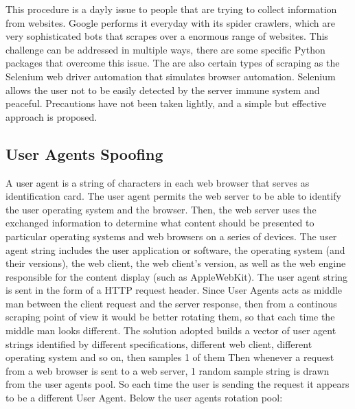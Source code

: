 \documentclass[
  12pt,
  a4paper,
  oneside]{book}
\begin{document}
This procedure is a dayly issue to people that are trying to collect information from websites. Google performs it everyday with its spider crawlers, which are very sophisticated bots that scrapes over a enormous range of websites. This challenge can be addressed in multiple ways, there are some specific Python packages that overcome this issue. The are also certain types of scraping as the Selenium web driver automation that simulates browser automation. Selenium allows the user not to be easily detected by the server immune system and peaceful. Precautions have not been taken lightly, and a simple but effective approach is proposed.

\hypertarget{spoofing}{%
\subsection{User Agents Spoofing}\label{spoofing}}

A user agent \citep{whoishostingthis.com} is a string of characters in each web browser that serves as identification card. The user agent permits the web server to be able to identify the user operating system and the browser. Then, the web server uses the exchanged information to determine what content should be presented to particular operating systems and web browsers on a series of devices. The user agent string includes the user application or software, the operating system (and their versions), the web client, the web client's version, as well as the web engine responsible for the content display (such as AppleWebKit). The user agent string is sent in the form of a HTTP request header. Since User Agents acts as middle man between the client request and the server response, then from a continous scraping point of view it would be better rotating them, so that each time the middle man looks different. The solution adopted builds a vector of user agent strings identified by different specifications, different web client, different operating system and so on, then samples 1 of them
Then whenever a request from a web browser is sent to a web server, 1 random sample string is drawn from the user agents pool. So each time the user is sending the request it appears to be a different User Agent.
Below the user agents rotation pool:
\end{document}
